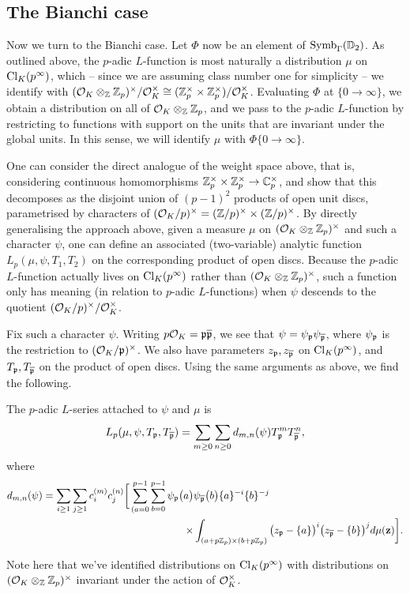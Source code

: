 \documentclass[a4paper,10pt]{article}
\numberwithin{equation}{section}
\begin{document}
\subsection{The Bianchi case}
Now we turn to the Bianchi case. Let $\Phi$ now be an element of $\mathrm{Symb}_{\Gamma}(\mathbb{D}_2)$. As outlined above, the $p$-adic $L$-function is most naturally a distribution $\mu$ on $\mathrm{Cl}_K(p^\infty)$, which -- since we are assuming class number one for simplicity -- we identify with $(\mathcal{O}_K\otimes_{\mathbb{Z}}\mathbb{Z}_p)^\times/\mathcal{O}_K^\times \cong (\mathbb{Z}_p^\times \times \mathbb{Z}_p^\times)/\mathcal{O}_K^\times$. Evaluating $\Phi$ at $\{0\rightarrow\infty\}$, we obtain a distribution on all of $\mathcal{O}_K\otimes_{\mathbb{Z}} \mathbb{Z}_p$, and we pass to the $p$-adic $L$-function by restricting to functions with support on the units that are invariant under the global units. In this sense, we will identify $\mu$ with $\Phi\{0\rightarrow\infty\}$.

One can consider the direct analogue of the weight space above, that is, considering continuous homomorphisms $\mathbb{Z}_p^\times \times \mathbb{Z}_p^\times \rightarrow \mathbb{C}_p^\times$, and show that this decomposes as the disjoint union of $(p-1)^2$ products of open unit discs, parametrised by characters of $(\mathcal{O}_K/p)^\times = (\mathbb{Z}/p)^\times \times (\mathbb{Z}/p)^\times$. By directly generalising the approach above, given a measure $\mu$ on $(\mathcal{O}_K\otimes_{\mathbb{Z}}\mathbb{Z}_p)^\times$ and such a character $\psi$, one can define an associated (two-variable) analytic function $L_p(\mu,\psi,T_1,T_2)$ on the corresponding product of open discs. Because the $p$-adic $L$-function actually lives on $\mathrm{Cl}_K(p^\infty)$ rather than $(\mathcal{O}_K\otimes_{\mathbb{Z}}\mathbb{Z}_p)^\times$, such a function only has meaning (in relation to $p$-adic $L$-functions) when $\psi$ descends to the quotient $(\mathcal{O}_K/p)^\times/\mathcal{O}_K^\times$.

Fix such a character $\psi$. Writing $p\mathcal{O}_K = \mathfrak{p}\overline{\mathfrak{p}}$, we see that $\psi = \psi_{\mathfrak{p}}\psi_{\overline{\mathfrak{p}}}$, where $\psi_{\mathfrak{p}}$ is the restriction to $(\mathcal{O}_K/\mathfrak{p})^\times$. We also have parameters $z_{\mathfrak{p}}, z_{\overline{\mathfrak{p}}}$ on $\mathrm{Cl}_K(p^\infty)$, and $T_{\mathfrak{p}}, T_{\overline{\mathfrak{p}}}$ on the product of open discs. Using the same arguments as above, we find the following.

\begin{proposition}
The $p$-adic $L$-series attached to $\psi$ and $\mu$ is
\[
	L_p(\mu,\psi,T_{\mathfrak{p}},T_{\overline{\mathfrak{p}}}) = \sum_{m\geq 0}\sum_{n\geq 0} d_{m,n}(\psi) T_{\mathfrak{p}}^mT_{\overline{\mathfrak{p}}}^n,
\]
where
\begin{align*} 
    d_{m,n}(\psi) = \sum_{i\geq 1} \sum_{j\geq 1} c_i^{(m)} c_j^{(n)} \bigg[\sum_{(a=0}
^{p-1}\sum_{b=0}^{p-1} \psi_{\mathfrak{p}}\big(a\big) &\psi_{\overline{\mathfrak{p}}}\big(b\big) \{a\}^{-i} \{b\}^{-j} \\
\times &\int_{(a+p\mathbb{Z}_p) \times (b+p\mathbb{Z}_p)} \big(z_{\mathfrak{p}}-\{a\}\big)^i \big(z_{\overline{\mathfrak{p}}}-\{b\}\big)^j d\mu(\mathbf{z}) \bigg].
\end{align*}
\end{proposition}
Note here that we've identified distributions on $\mathrm{Cl}_K(p^\infty)$ with distributions on $(\mathcal{O}_K\otimes_{\mathbb{Z}}\mathbb{Z}_p)^\times$ invariant under the action of $\mathcal{O}_K^\times$.
\end{document}
